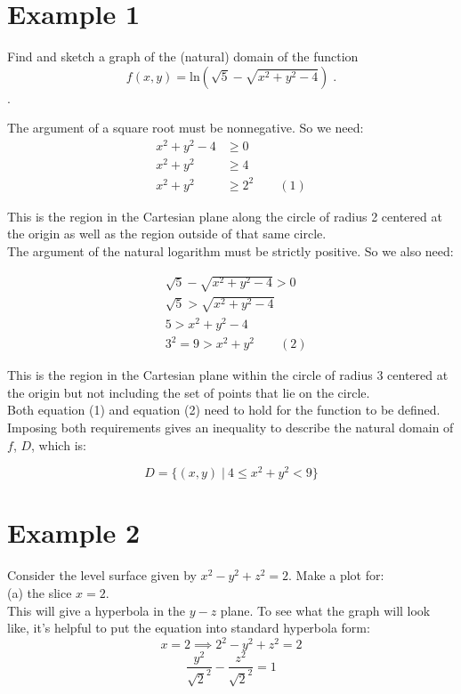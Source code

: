 \documentclass[11pt]{article}
\begin{document}
\section*{Example 1}

Find and sketch a graph of the (natural) domain of the function
$$f(x,y) = \text{ln}(\sqrt{5} - \sqrt{x^2+y^2-4}) \;.$$.

The argument of a square root must be nonnegative. So we need:
\begin{align*}
x^2+y^2 - 4 &\geq 0\\
x^2 + y^2 & \geq 4 \\
x^2 + y^2 & \geq 2^2 \quad \quad (1)
\end{align*}

This is the region in the Cartesian plane along the circle of radius 2 centered at the origin as well as the region outside of that same circle.\\


The argument of the natural logarithm must be strictly positive. So we also need:

\begin{align*}
&\sqrt{5} - \sqrt{x^2 + y^2 - 4} > 0\\
&\sqrt{5}  > \sqrt{x^2 + y^2 - 4} \\
&5  > x^2 + y^2 - 4\\
&3^2= 9  > x^2 + y^2 \quad \quad (2)
\end{align*}

This is the region in the Cartesian plane within the circle of radius 3 centered at the origin but not including the set of points that lie on the circle.\\

Both equation (1) and equation (2) need to hold for the function to be defined. Imposing both requirements gives an inequality to describe the natural domain of $f$, $D$, which is:

$$D = \{(x,y) \; | \:  4 \leq x^2 +y^2 < 9 \}$$
\newpage




\section*{Example 2}

Consider the level surface given by $x^2-y^2+z^2 = 2$. Make a plot for:\\

(a) the slice $x = 2$.\\

This will give a hyperbola in the $y-z$ plane. To see what the graph will look like, it's helpful to put the equation into standard hyperbola form:
$$x = 2 \implies 2^2 - y^2 + z^2 = 2$$
$$\frac{y^2}{\sqrt{2}^2} - \frac{z^2}{\sqrt{2}^2} = 1$$
\vspace{4cm}
\end{document}
